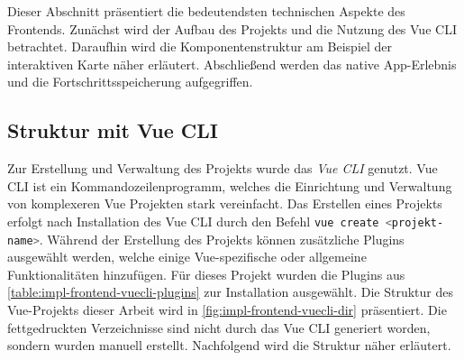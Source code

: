 Dieser Abschnitt präsentiert die bedeutendsten technischen Aspekte des Frontends.
Zunächst wird der Aufbau des Projekts und die Nutzung des Vue CLI betrachtet.
Daraufhin wird die Komponentenstruktur am Beispiel der interaktiven Karte näher
erläutert. Abschließend werden das native App-Erlebnis und die
Fortschrittsspeicherung aufgegriffen.

\subsection{Struktur mit Vue CLI} \label{ssec:impl-frontend-structure}

Zur Erstellung und Verwaltung des Projekts wurde das \textit{Vue CLI} genutzt.
Vue CLI ist ein Kommandozeilenprogramm, welches die Einrichtung und Verwaltung
von komplexeren Vue Projekten stark vereinfacht. Das Erstellen eines Projekts
erfolgt nach Installation des Vue CLI durch den Befehl \lstinline[style=code,
    language=bash, style=inline]{vue create <projekt-name>}. Während der Erstellung
des Projekts können zusätzliche Plugins ausgewählt werden, welche einige
Vue-spezifische oder allgemeine Funktionalitäten hinzufügen. Für dieses Projekt
wurden die Plugins aus \autoref{table:impl-frontend-vuecli-plugins} zur
Installation ausgewählt. Die Struktur des Vue-Projekts dieser Arbeit wird in
\autoref{fig:impl-frontend-vuecli-dir} präsentiert. Die fettgedruckten
Verzeichnisse sind nicht durch das Vue CLI generiert worden, sondern wurden
manuell erstellt. Nachfolgend wird die Struktur näher erläutert.

